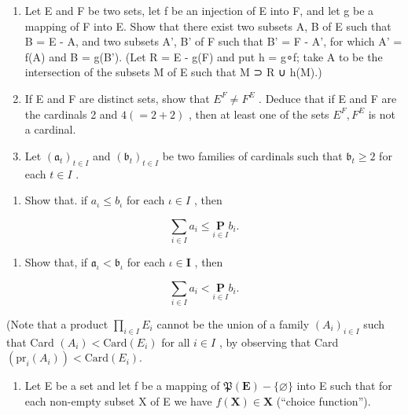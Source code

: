 \exercisegroup

\begin{enumerate}
\def\labelenumi{\arabic{enumi}.}
\item
  Let E and F be two sets, let f be an injection of E into F, and let g be a mapping of F into E. Show that there exist two subsets A, B of E such that B = E - A, and two subsets A', B' of F such that B' = F - A', for which A' = f(A) and B = g(B'). (Let R = E - g(F) and put h = g∘f; take A to be the intersection of the subsets M of E such that M ⊃ R ∪ h(M).)
\item
  If E and F are distinct sets, show that \(E^{F} \neq F^{E}\) . Deduce that if E and F are the cardinals 2 and \(4(=2+2)\) , then at least one of the sets \(E^{F}, F^{E}\) is not a cardinal.
\item
  Let \((\mathfrak{a}_t)_{t\in I}\) and \((\mathfrak{b}_t)_{t\in I}\) be two families of cardinals such that \(\mathfrak{b}_t\geqslant 2\) for each \(t\in I\) .
\end{enumerate}

\begin{enumerate}
\def\labelenumi{(\alph{enumi})}
\tightlist
\item
  Show that. if \(a_{\iota} \leqslant b_{\iota}\) for each \(\iota \in I\) , then
\end{enumerate}

\[
\sum_ {i \in I} a _ {i} \leqslant \underset {i \in I} {\mathbf {P}} b _ {i}.
\]

\begin{enumerate}
\def\labelenumi{(\alph{enumi})}
\setcounter{enumi}{1}
\tightlist
\item
  Show that, if \(\mathfrak{a}_{\iota} < \mathfrak{b}_{\iota}\) for each \(\iota \in \mathbf{I}\) , then
\end{enumerate}

\[
\sum_ {i \in I} a _ {i} <   \underset {i \in I} {\mathbf {P}} b _ {i}.
\]

(Note that a product \(\prod_{i\in I}E_i\) cannot be the union of a family \((A_i)_{i\in I}\) such that Card \((A_i) < \text{Card}(E_i)\) for all \(i\in I\) , by observing that Card \((\text{pr}_i(A_i)) < \text{Card}(E_i).\)

\begin{enumerate}
\def\labelenumi{\arabic{enumi}.}
\setcounter{enumi}{3}
\tightlist
\item
  Let E be a set and let f be a mapping of \(\mathfrak{P}(\mathbf{E}) - \{\varnothing\}\) into E such that for each non-empty subset X of E we have \(f(\mathbf{X}) \in \mathbf{X}\) (``choice function'').
\end{enumerate}

